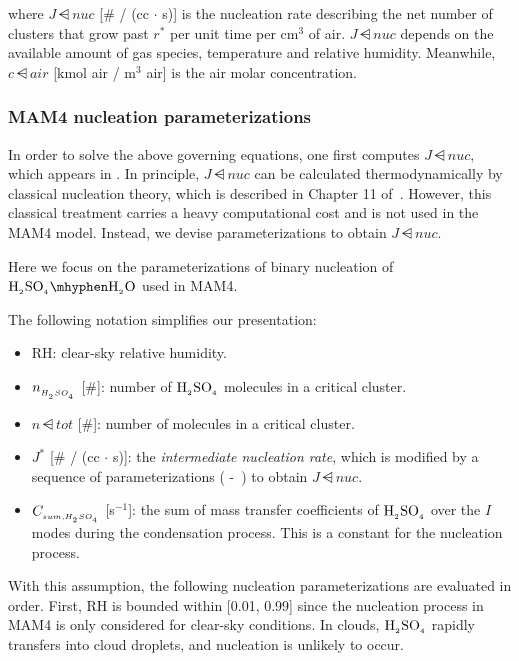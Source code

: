 where $J\dsub{nuc}$ [\# / (cc $\cdot$ s)] is the nucleation rate describing the
net number of clusters that grow past $r^*$ per unit time per cm$^{3}$ of
air. $J\dsub{nuc}$ depends on the available amount of gas species, temperature
and relative humidity. Meanwhile, $c\dsub{air}$ [kmol air / m$^3$ air] is
the air molar concentration.

\subsubsection{MAM4 nucleation parameterizations} 

In order to solve the above governing equations, one first computes $J\dsub{nuc}$,
which appears in . In principle, $J\dsub{nuc}$ can be calculated
thermodynamically by classical nucleation theory, which is described in
Chapter 11 of~\cite{seinfeld-2006-acp}. However, this classical treatment
carries a heavy computational cost and is not used in the MAM4 model. Instead,
we devise parameterizations to obtain $J\dsub{nuc}$.

Here we focus on the parameterizations of binary nucleation of
$\rsag \mhyphen \rwater$ used in MAM4.

The following notation simplifies our presentation:
\begin{itemize}
  \item RH: clear-sky relative humidity.
  \item $n_{_{H_{_2}SO_{_4}}}$ [\#]: number of $\rm H_{_2}SO_{_4}$ molecules in a critical cluster.
  \item $n\dsub{tot}$ [\#]: number of molecules in a critical cluster.
  \item $J^*$ [\# / (cc $\cdot$ s)]: the {\em intermediate nucleation rate},
        which is modified by a sequence of parameterizations
        ( -~) to
        obtain $J\dsub{nuc}$.
  \item $C_{_{sum,H_{_2}SO_{_4}}}$ [s$^{-1}$]: the sum of mass transfer coefficients of
        $\rm H_{_2}SO_{_4}$ over the $I$ modes during the condensation process. This is a
        constant for the nucleation process.
\end{itemize}

With this assumption, the following nucleation parameterizations are evaluated
in order. First, RH is bounded within [0.01, 0.99] since the nucleation process
in MAM4 is only considered for clear-sky conditions. In clouds, $\rm H_{_2}SO_{_4}$
rapidly transfers into cloud droplets, and nucleation is unlikely to occur.

